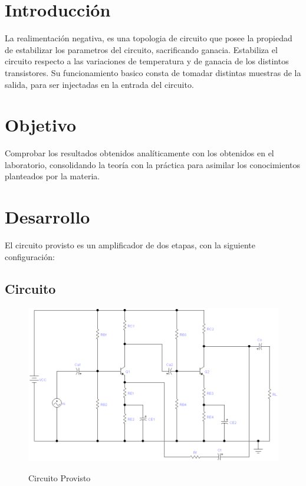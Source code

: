 \documentclass[12pt]{article}
\begin{document}

\tableofcontents
\pagebreak


\section{Introducción}
La realimentación negativa, es una topologia de circuito que posee la propiedad de estabilizar los parametros del circuito,
sacrificando ganacia. Estabiliza el circuito respecto a las variaciones de temperatura y de ganacia de los distintos transistores.
Su funcionamiento basico consta de tomadar distintas muestras de la salida, para ser injectadas en la entrada del circuito.

\section{Objetivo}
Comprobar los resultados obtenidos analíticamente con los obtenidos en el laboratorio, consolidando
la teoría con la práctica para asimilar los conocimientos planteados por la materia.
\newpage
\section{Desarrollo}
El circuito provisto es un amplificador de dos etapas, con la siguiente configuración:
\vspace{1cm}
\subsection{Circuito}
\begin{figure}[ht]
\centering 
\includegraphics[scale = 0.4]{circuito.png}\\[0.25 cm]	%
\caption{Circuito Provisto}
\label{Figura 1}
\end{figure}
\end{document}
